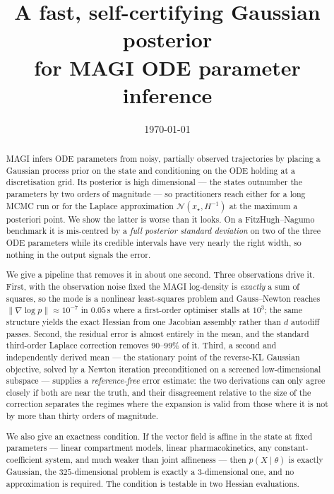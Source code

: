 \documentclass[11pt]{article}
\title{\bfseries A fast, self-certifying Gaussian posterior\\[2pt] for MAGI ODE parameter inference}
\author{}
\date{\today}
\newcommand{\xmap}{x_{\star}}
\theoremstyle{plain}
\theoremstyle{definition}
\theoremstyle{remark}
\begin{document}
\maketitle

\begin{abstract}
\noindent
MAGI \cite{yang2021} infers ODE parameters from noisy, partially observed trajectories by placing a
Gaussian process prior on the state and conditioning on the ODE holding at a discretisation grid.
Its posterior is high dimensional --- the states outnumber the parameters by two orders of
magnitude --- so practitioners reach either for a long MCMC run or for the Laplace approximation
$\mathcal{N}(\xmap, H^{-1})$ at the maximum a posteriori point. We show the latter is worse than it
looks. On a FitzHugh--Nagumo benchmark it is mis-centred by a \emph{full posterior standard
deviation} on two of the three ODE parameters while its credible intervals have very nearly the
right width, so nothing in the output signals the error.

We give a pipeline that removes it in about one second. Three observations drive it. First, with
the observation noise fixed the MAGI log-density is \emph{exactly} a sum of squares, so the mode is
a nonlinear least-squares problem and Gauss--Newton reaches $\|\nabla \log p\| \approx 10^{-7}$ in
$0.05$\,s where a first-order optimiser stalls at $10^{3}$; the same structure yields the exact
Hessian from one Jacobian assembly rather than $d$ autodiff passes. Second, the residual error is
almost entirely in the mean, and the standard third-order Laplace correction removes $90$--$99\%$
of it. Third, a second and independently derived mean --- the stationary point of the reverse-KL
Gaussian objective, solved by a Newton iteration preconditioned on a screened low-dimensional
subspace --- supplies a \emph{reference-free} error estimate: the two derivations can only agree
closely if both are near the truth, and their disagreement relative to the size of the correction
separates the regimes where the expansion is valid from those where it is not by more than thirty
orders of magnitude.

We also give an exactness condition. If the vector field is affine in the state at fixed parameters
--- linear compartment models, linear pharmacokinetics, any constant-coefficient system, and much
weaker than joint affineness --- then $p(X \mid \theta)$ is exactly Gaussian, the $325$-dimensional
problem is exactly a $3$-dimensional one, and no approximation is required. The condition is
testable in two Hessian evaluations.


\end{abstract}
\end{document}

